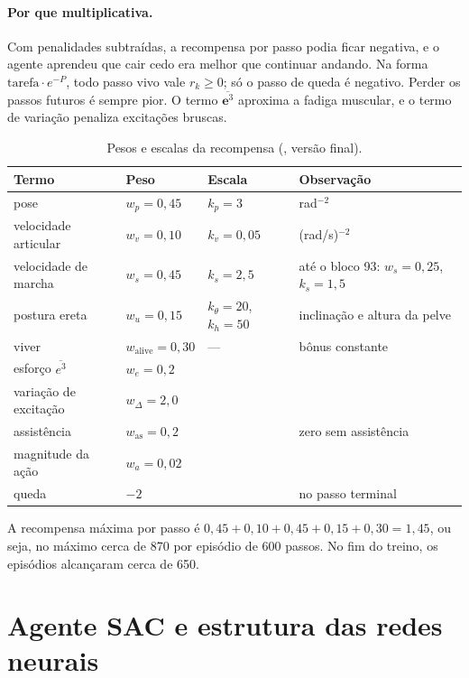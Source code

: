 \documentclass[11pt,a4paper]{article}
\begin{document}
\paragraph{Por que multiplicativa.} Com penalidades subtraídas, a recompensa por passo podia ficar
negativa, e o agente aprendeu que cair cedo era melhor que continuar andando. Na forma
$\text{tarefa}\cdot e^{-P}$, todo passo vivo vale $r_k\ge0$; só o passo de queda é negativo. Perder os
passos futuros é sempre pior. O termo $\overline{\mathbf e^3}$ aproxima a fadiga muscular, e o termo de
variação penaliza excitações bruscas.

\begin{table}[H]
\centering\small
\caption{Pesos e escalas da recompensa (\protect{}, versão final).}
\label{tab:rew}
\begin{tabular}{@{}llll@{}}
\toprule
Termo & Peso & Escala & Observação \\ \midrule
pose & $w_p=0{,}45$ & $k_p=3$ & rad$^{-2}$ \\
velocidade articular & $w_v=0{,}10$ & $k_v=0{,}05$ & (rad/s)$^{-2}$ \\
velocidade de marcha & $w_s=0{,}45$ & $k_s=2{,}5$ & até o bloco 93: $w_s=0{,}25$, $k_s=1{,}5$ \\
postura ereta & $w_u=0{,}15$ & $k_\theta=20$, $k_h=50$ & inclinação e altura da pelve \\
viver & $w_{\mathrm{alive}}=0{,}30$ & --- & bônus constante \\ \midrule
esforço $\overline{e^3}$ & $w_e=0{,}2$ & & \\
variação de excitação & $w_\Delta=2{,}0$ & & \\
assistência & $w_{\mathrm{as}}=0{,}2$ & & zero sem assistência \\
magnitude da ação & $w_a=0{,}02$ & & \\ \midrule
queda & $-2$ & & no passo terminal \\
\bottomrule
\end{tabular}
\end{table}
A recompensa máxima por passo é $0{,}45+0{,}10+0{,}45+0{,}15+0{,}30=1{,}45$, ou seja, no máximo cerca de 870
por episódio de 600 passos. No fim do treino, os episódios alcançaram cerca de 650.

\section{Agente SAC e estrutura das redes neurais}
\end{document}
